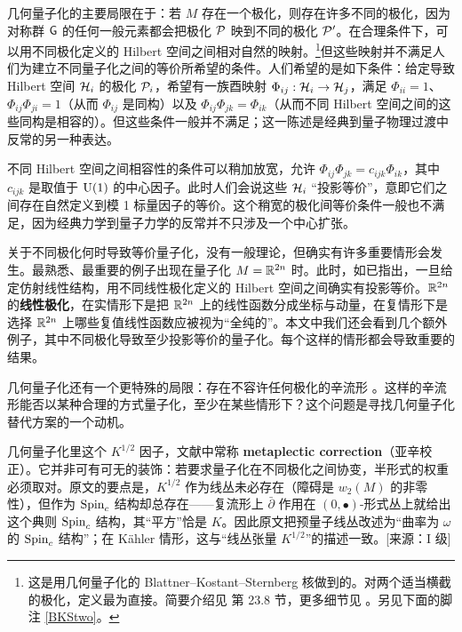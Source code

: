 几何量子化的主要局限在于：若 $M$ 存在一个极化，则存在许多不同的极化，因为对称群 $\G$ 的任何一般元素都会把极化 $\P$ 映到不同的极化 $\P'$。在合理条件下，可以用不同极化定义的 Hilbert 空间之间相对自然的映射。\footnote{\label{BKS}这是用几何量子化的 Blattner--Kostant--Sternberg 核做到的。对两个适当横截的极化，定义最为直接。简要介绍见 \cite{Hall} 第 23.8 节，更多细节见 \cite{Snia}。另见下面的脚注 \ref{BKStwo}。}但这些映射并不满足人们为建立不同量子化之间的等价所希望的条件。人们希望的是如下条件：给定导致 Hilbert 空间 $\H_i$ 的极化 $\P_i$，希望有一族酉映射 $\Phi_{ij}:\H_i\to \H_j$，满足 $\Phi_{ii}=1$、$\Phi_{ij}\Phi_{ji}=1$（从而 $\Phi_{ij}$ 是同构）以及 $\Phi_{ij}\Phi_{jk}=\Phi_{ik}$（从而不同 Hilbert 空间之间的这些同构是相容的）。但这些条件一般并不满足；这一陈述是经典到量子物理过渡中反常的另一种表达。

不同 Hilbert 空间之间相容性的条件可以稍加放宽，允许 $\Phi_{ij}\Phi_{jk}=c_{ijk} \Phi_{ik}$，其中 $c_{ijk}$ 是取值于 $\UU(1)$ 的中心因子。此时人们会说这些 $\H_i$ “投影等价”，意即它们之间存在自然定义到模 1 标量因子的等价。这个稍宽的极化间等价条件一般也不满足，因为经典力学到量子力学的反常并不只涉及一个中心扩张。

关于不同极化何时导致等价量子化，没有一般理论，但确实有许多重要情形会发生。最熟悉、最重要的例子出现在量子化 $M=\R^{2n}$ 时。此时，如已指出，一旦给定仿射线性结构，用不同线性极化定义的 Hilbert 空间之间确实有投影等价。$\R^{2n}$ 的\textbf{线性极化}，在实情形下是把 $\R^{2n}$ 上的线性函数分成坐标与动量，在复情形下是选择 $\R^{2n}$ 上哪些复值线性函数应被视为“全纯的”。本文中我们还会看到几个额外例子，其中不同极化导致至少投影等价的量子化。每个这样的情形都会导致重要的结果。

几何量子化还有一个更特殊的局限：存在不容许任何极化的辛流形 \cite{Gotay}。这样的辛流形能否以某种合理的方式量子化，至少在某些情形下？这个问题是寻找几何量子化替代方案的一个动机。

\begin{yizhu}
几何量子化里这个 $K^{1/2}$ 因子，文献中常称 \textbf{metaplectic correction}（亚辛校正）。它并非可有可无的装饰：若要求量子化在不同极化之间协变，半形式的权重必须取对。原文的要点是，$K^{1/2}$ 作为线丛未必存在（障碍是 $w_2(M)$ 的非零性），但作为 $\Spinc$ 结构却总存在——复流形上 $\bar\partial$ 作用在 $(0,\bullet)$-形式丛上就给出这个典则 $\Spinc$ 结构，其“平方”恰是 $K$。因此原文把预量子线丛改述为“曲率为 $\omega$ 的 $\Spinc$ 结构”；在 Kähler 情形，这与“线丛张量 $K^{1/2}$”的描述一致。[来源：I 级]
\end{yizhu}
